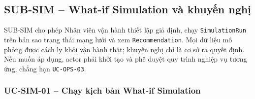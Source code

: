 \subsection{SUB-SIM -- What-if Simulation và khuyến nghị}

SUB-SIM cho phép Nhân viên vận hành thiết lập giả định, chạy \texttt{SimulationRun} trên bản sao trạng thái mạng lưới và xem \texttt{Recommendation}. Mọi dữ liệu mô phỏng được cách ly khỏi vận hành thật; khuyến nghị chỉ là cơ sở ra quyết định. Nếu muốn áp dụng, actor phải khởi tạo và phê duyệt quy trình nghiệp vụ tương ứng, chẳng hạn \texttt{UC-OPS-03}.

\subsubsection{UC-SIM-01 -- Chạy kịch bản What-if Simulation}


